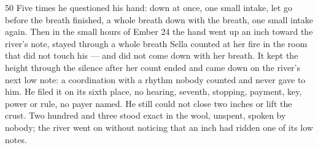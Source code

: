 \begin{CRchronicle}{50}
Five times he questioned his hand: down at once, one small intake, let go before the breath finished, a whole breath down with the breath, one small intake again. Then in the small hours of Ember 24 the hand went up an inch toward the river’s note, stayed through a whole breath Sella counted at her fire in the room that did not touch his --- and did not come down with her breath. It kept the height through the silence after her count ended and came down on the river’s next low note: a coordination with a rhythm nobody counted and never gave to him. He filed it on its sixth place, no hearing, seventh, stopping, payment, key, power or rule, no payer named. He still could not close two inches or lift the crust. Two hundred and three stood exact in the wool, unspent, spoken by nobody; the river went on without noticing that an inch had ridden one of its low notes.
\end{CRchronicle}
